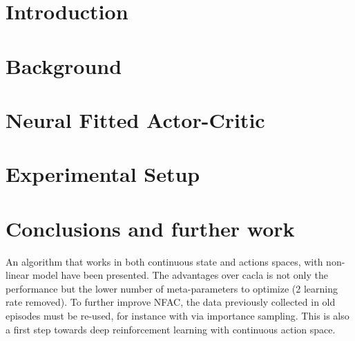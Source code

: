 \documentclass{style/esannV2}
\begin{document}
\section{Introduction}



\section{Background}



\section{Neural Fitted Actor-Critic}



\section{Experimental Setup}



\section{Conclusions and further work}
An algorithm that works in both continuous state and actions spaces, 
with non-linear model have been presented.
The advantages over cacla is not only the performance but the lower 
number of meta-parameters to optimize (2 learning rate removed).
To further improve NFAC, the data previously collected in old episodes must be re-used, for instance with via importance sampling.
This is also a first step towards deep reinforcement learning with continuous action space.


\end{document}
